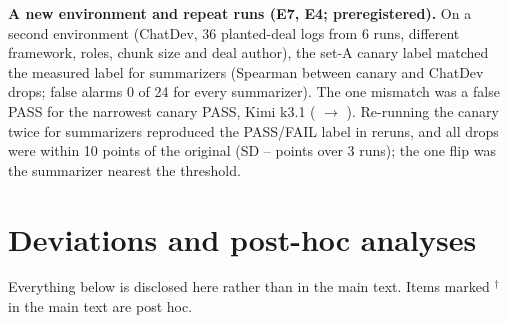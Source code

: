 \documentclass[11pt]{article}
\begin{document}
\textbf{A new environment and repeat runs (E7, E4; preregistered).} On a second environment (ChatDev, 36 planted-deal logs from 6 runs, different framework, roles, chunk size and deal author), the set-A canary label matched the measured label for  summarizers (Spearman  between canary and ChatDev drops; false alarms 0 of 24 for every summarizer). The one mismatch was a false PASS for the narrowest canary PASS, Kimi k3.1 ( $\to$ ). Re-running the canary twice for  summarizers reproduced the PASS/FAIL label in  reruns, and all  drops were within 10 points of the original (SD -- points over 3 runs); the one flip was the summarizer nearest the threshold.

\section{Deviations and post-hoc analyses}
\label{app:dev}
Everything below is disclosed here rather than in the main text. Items marked $^\dagger$ in the main text are post hoc.
\end{document}
